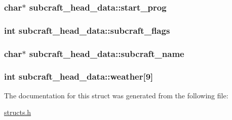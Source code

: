 \hypertarget{structsubcraft__head__data_a1ce764d4d0b2cac40d916d44407cb3c7}{
\subsubsection[{start\-\_\-prog}]{\setlength{\rightskip}{0pt plus 5cm}char$\ast$ subcraft\-\_\-head\-\_\-data\-::start\-\_\-prog}}\label{structsubcraft__head__data_a1ce764d4d0b2cac40d916d44407cb3c7}
\hypertarget{structsubcraft__head__data_a5f1abb33f003ee3237e0f21d688c88c3}{
\subsubsection[{subcraft\-\_\-flags}]{\setlength{\rightskip}{0pt plus 5cm}int subcraft\-\_\-head\-\_\-data\-::subcraft\-\_\-flags}}\label{structsubcraft__head__data_a5f1abb33f003ee3237e0f21d688c88c3}
\hypertarget{structsubcraft__head__data_a011bfa753e34f34f50f725cdb16601a8}{
\subsubsection[{subcraft\-\_\-name}]{\setlength{\rightskip}{0pt plus 5cm}char$\ast$ subcraft\-\_\-head\-\_\-data\-::subcraft\-\_\-name}}\label{structsubcraft__head__data_a011bfa753e34f34f50f725cdb16601a8}
\hypertarget{structsubcraft__head__data_a200cee3cf32033ef96135725305d2a27}{
\subsubsection[{weather}]{\setlength{\rightskip}{0pt plus 5cm}int subcraft\-\_\-head\-\_\-data\-::weather\mbox{[}9\mbox{]}}}\label{structsubcraft__head__data_a200cee3cf32033ef96135725305d2a27}


The documentation for this struct was generated from the following file\-:\begin{DoxyCompactItemize}
\item 
\hyperlink{structs_8h}{structs.\-h}\end{DoxyCompactItemize}
